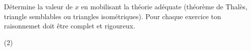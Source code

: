 %
%
    Détermine la valeur de $x$ en mobilisant la théorie adéquate (théorème de Thalès, triangle semblables ou triangles isométriques). Pour chaque exercice ton raisonnemet doit être complet et rigoureux.
    \begin{tasks}(2)
        \task 
        \task 
        \task 
        \task 
    \end{tasks}
